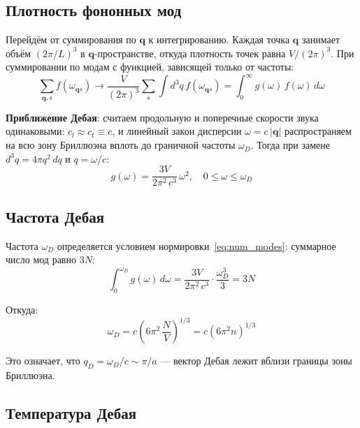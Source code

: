 \documentclass[../general/general]{subfiles}
\begin{document}
\subsection{Плотность фононных мод}

Перейдём от суммирования по $\mathbf{q}$ к интегрированию. Каждая точка $\mathbf{q}$ занимает объём $(2\pi/L)^3$ в $\mathbf{q}$-пространстве, откуда плотность точек равна $V/(2\pi)^3$. При суммировании по модам с функцией, зависящей только от частоты:
\begin{equation}
    \sum_{\mathbf{q},s} f(\omega_{\mathbf{q}s}) \longrightarrow \frac{V}{(2\pi)^3}\sum_s \int d^3q\, f(\omega_{\mathbf{q}s}) = \int_0^\infty g(\omega)\,f(\omega)\,d\omega
\end{equation}

\textbf{Приближение Дебая}: считаем продольную и поперечные скорости звука одинаковыми: $c_l \approx c_t \equiv c$, и линейный закон дисперсии $\omega = c\,|\mathbf{q}|$ распространяем на всю зону Бриллюэна вплоть до граничной частоты $\omega_D$. Тогда при замене $d^3q = 4\pi q^2\,dq$ и $q = \omega/c$:
\begin{equation}
    g(\omega) = \frac{3V}{2\pi^2\,c^3}\,\omega^2, \quad 0 \leq \omega \leq \omega_D
    \label{eq:dos_debye}
\end{equation}

\subsection{Частота Дебая}

Частота $\omega_D$ определяется условием нормировки~\eqref{eq:num_modes}: суммарное число мод равно $3N$:
\begin{equation}
    \int_0^{\omega_D} g(\omega)\,d\omega = \frac{3V}{2\pi^2\,c^3}\cdot\frac{\omega_D^3}{3} = 3N
\end{equation}

Откуда:
\begin{equation}
    \boxed{\omega_D = c\!\left(6\pi^2\,\frac{N}{V}\right)^{1/3} = c\!\left(6\pi^2 n\right)^{1/3}}
    \label{eq:omega_D}
\end{equation}

Это означает, что $q_D = \omega_D/c \sim \pi/a$ --- вектор Дебая лежит вблизи границы зоны Бриллюэна.

\subsection{Температура Дебая}
\end{document}
